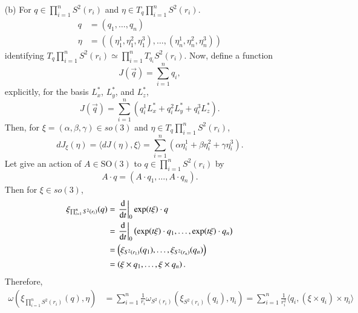 \documentclass[a4paper, 12pt]{article}
\theoremstyle{Mydefinition}
\theoremstyle{Mytheorem}
\begin{document}
\begin{enumerate}
    \item[(b)] For $q\in \prod_{i=1}^n S^2(r_i)$ and $\eta \in T_q\prod_{i=1}^n S^2(r_i)$.
    \begin{equation*}
    \begin{split}
        q&=(q_1, \ldots, q_n)\\
        \eta&=((\eta^1_1, \eta^2_1,\eta^3_1), \ldots, (\eta^1_n, \eta^2_n,\eta^3_n))
    \end{split}
    \end{equation*}
    identifying $T_q\prod_{i=1}^n S^2(r_i)\simeq \prod_{i=1}^n T_{q_i}S^2(r_i)$.
    Now, define a function
    \begin{equation*}
        J(\vec{q}) = \sum_{i=1}^n q_i,
    \end{equation*}
    explicitly, for the basis $L_x^*$, $L_y^*$, and $L_z^*$,
    \begin{equation*}
        J(\vec{q}) = \sum_{i=1}^n (q_i^1L_x^* + q_i^2L_y^* + q_i^3L_z^*).
    \end{equation*}
    Then, for $\xi=(\alpha,\beta,\gamma)\in \mathit{so}(3)$ and $\eta \in T_{q}\prod_{i=1}^n S^2(r_i)$,
    \begin{equation*}
        dJ_\xi(\eta) =\langle dJ(\eta), \xi\rangle = \sum_{i=1}^n (\alpha \eta_i^1 + \beta \eta_i^2 + \gamma \eta_i^3).
    \end{equation*}
    Let give an action of $A\in \mathrm{SO}(3)$ to $q\in\prod_{i=1}^n S^2(r_i)$ by
    \begin{equation*}
        A\cdot q = \left(A\cdot q_1, \ldots, A\cdot q_n\right).
    \end{equation*}
    Then for $\xi\in \mathit{so}(3)$,
    \begin{equation*}
    \begin{split}
        \xi_{\prod_{i=1}^n S^2(r_i)}(q) &= \left.\dv{t}\right|_{0}\exp(t\xi)\cdot q \\
        &= \left.\dv{t}\right|_{0}\left(\exp(t\xi)\cdot q_1, \ldots, \exp(t\xi)\cdot q_n\right)\\
        &= \left(\xi_{S^2(r_1)}(q_1), \ldots, \xi_{S^2(r_n)}(q_n)\right)\\
        &=\left(\xi\times q_1, \ldots, \xi\times q_n\right).
    \end{split}
    \end{equation*}
    Therefore,
    \begin{equation*}
    \begin{split}
        \omega(\xi_{\prod_{i=1}^n S^2(r_i)}(q),\eta) &=\sum_{i=1}^n \frac{1}{r_i}\omega_{S^2(r_i)}(\xi_{S^2(r_i)}(q_i),\eta_i)= \sum_{i=1}^n \frac{1}{r_i^2}\langle q_i, (\xi\times q_i)\times \eta_i\rangle\\

\end{split}
\end{equation*}
\end{enumerate}
\end{document}
